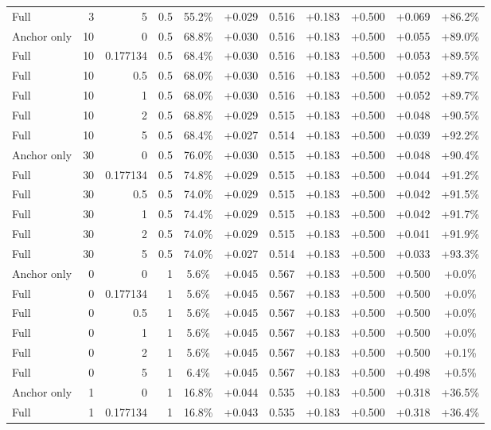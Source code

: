 \begin{table}[htbp]
\begin{tabular}{lrrrccccccc}
Full & 3 & 5 & 0.5 & 55.2\% & +0.029 & 0.516 & +0.183 & +0.500 & +0.069 & +86.2\% \\
Anchor only & 10 & 0 & 0.5 & 68.8\% & +0.030 & 0.516 & +0.183 & +0.500 & +0.055 & +89.0\% \\
Full & 10 & 0.177134 & 0.5 & 68.4\% & +0.030 & 0.516 & +0.183 & +0.500 & +0.053 & +89.5\% \\
Full & 10 & 0.5 & 0.5 & 68.0\% & +0.030 & 0.516 & +0.183 & +0.500 & +0.052 & +89.7\% \\
Full & 10 & 1 & 0.5 & 68.0\% & +0.030 & 0.516 & +0.183 & +0.500 & +0.052 & +89.7\% \\
Full & 10 & 2 & 0.5 & 68.8\% & +0.029 & 0.515 & +0.183 & +0.500 & +0.048 & +90.5\% \\
Full & 10 & 5 & 0.5 & 68.4\% & +0.027 & 0.514 & +0.183 & +0.500 & +0.039 & +92.2\% \\
Anchor only & 30 & 0 & 0.5 & 76.0\% & +0.030 & 0.515 & +0.183 & +0.500 & +0.048 & +90.4\% \\
Full & 30 & 0.177134 & 0.5 & 74.8\% & +0.029 & 0.515 & +0.183 & +0.500 & +0.044 & +91.2\% \\
Full & 30 & 0.5 & 0.5 & 74.0\% & +0.029 & 0.515 & +0.183 & +0.500 & +0.042 & +91.5\% \\
Full & 30 & 1 & 0.5 & 74.4\% & +0.029 & 0.515 & +0.183 & +0.500 & +0.042 & +91.7\% \\
Full & 30 & 2 & 0.5 & 74.0\% & +0.029 & 0.515 & +0.183 & +0.500 & +0.041 & +91.9\% \\
Full & 30 & 5 & 0.5 & 74.0\% & +0.027 & 0.514 & +0.183 & +0.500 & +0.033 & +93.3\% \\
Anchor only & 0 & 0 & 1 & 5.6\% & +0.045 & 0.567 & +0.183 & +0.500 & +0.500 & +0.0\% \\
Full & 0 & 0.177134 & 1 & 5.6\% & +0.045 & 0.567 & +0.183 & +0.500 & +0.500 & +0.0\% \\
Full & 0 & 0.5 & 1 & 5.6\% & +0.045 & 0.567 & +0.183 & +0.500 & +0.500 & +0.0\% \\
Full & 0 & 1 & 1 & 5.6\% & +0.045 & 0.567 & +0.183 & +0.500 & +0.500 & +0.0\% \\
Full & 0 & 2 & 1 & 5.6\% & +0.045 & 0.567 & +0.183 & +0.500 & +0.500 & +0.1\% \\
Full & 0 & 5 & 1 & 6.4\% & +0.045 & 0.567 & +0.183 & +0.500 & +0.498 & +0.5\% \\
Anchor only & 1 & 0 & 1 & 16.8\% & +0.044 & 0.535 & +0.183 & +0.500 & +0.318 & +36.5\% \\
Full & 1 & 0.177134 & 1 & 16.8\% & +0.043 & 0.535 & +0.183 & +0.500 & +0.318 & +36.4\% \\

\end{tabular}
\end{table}
